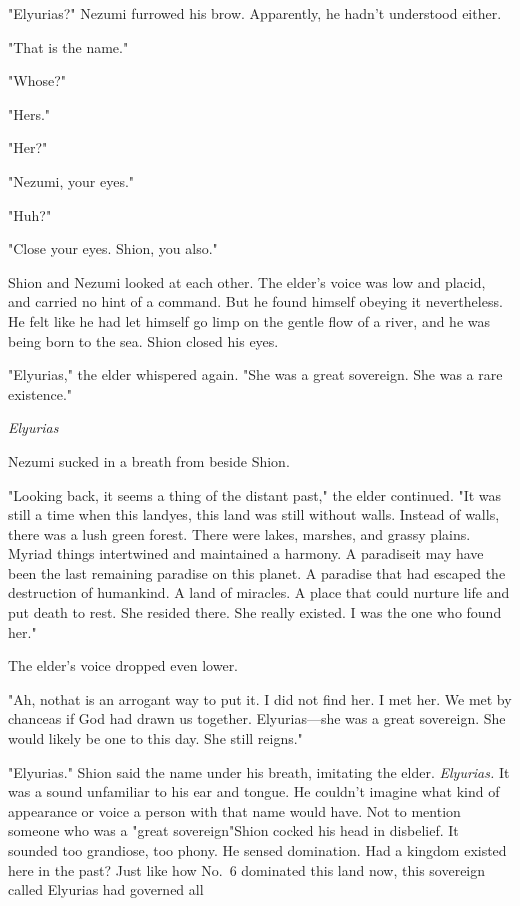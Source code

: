 "Elyurias?" Nezumi furrowed his brow. Apparently, he hadn't understood
either.

"That is the name."

"Whose?"

"Hers."

"Her?"

"Nezumi, your eyes."

"Huh?"

"Close your eyes. Shion, you also."

Shion and Nezumi looked at each other. The elder's voice was low and
placid, and carried no hint of a command. But he found himself obeying
it nevertheless. He felt like he had let himself go limp on the gentle
flow of a river, and he was being born to the sea. Shion closed his
eyes.

"Elyurias," the elder whispered again. "She was a great sovereign. She
was a rare existence."

\emph{Elyurias\el }

Nezumi sucked in a breath from beside Shion.

"Looking back, it seems a thing of the distant past," the elder
continued. "It was still a time when this land\el yes, this land was
still without walls. Instead of walls, there was a lush green forest.
There were lakes, marshes, and grassy plains. Myriad things intertwined
and maintained a harmony. A paradise\el it may have been the last
remaining paradise on this planet. A paradise that had escaped the
destruction of humankind. A land of miracles. A place that could nurture
life and put death to rest. She resided there. She really existed. I was
the one who found her."

The elder's voice dropped even lower.

"Ah, no\el that is an arrogant way to put it. I did not find her. I met
her. We met by chance\el as if God had drawn us together. Elyurias---she
was a great sovereign. She would likely be one to this day. She still
reigns."

"Elyurias." Shion said the name under his breath, imitating the elder.
\emph{Elyurias.} It was a sound unfamiliar to his ear and tongue. He couldn't
imagine what kind of appearance or voice a person with that name would
have. Not to mention someone who was a "great sovereign"\el Shion cocked
his head in disbelief. It sounded too grandiose, too phony. He sensed
domination. Had a kingdom existed here in the past? Just like how No.~6
dominated this land now, this sovereign called Elyurias had governed
all\el 


